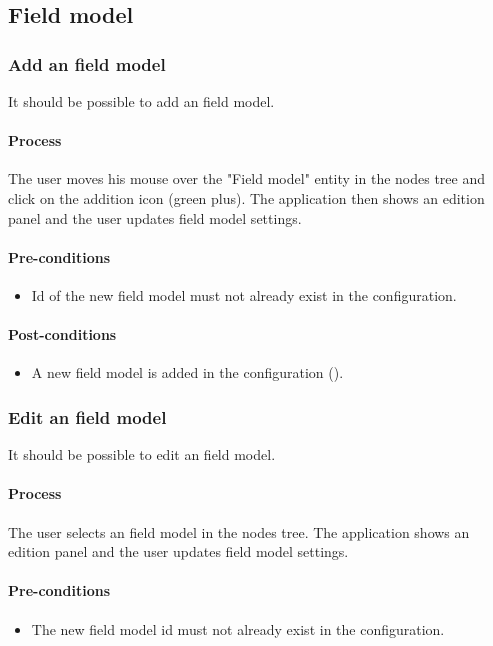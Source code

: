 \documentclass[11pt,a4paper,oneside]{article}
\begin{document}
\subsection{Field model}

\subsubsection{Add an field model}
It should be possible to add an field model.

\paragraph{Process}
The user moves his mouse over the "Field model" entity in the nodes tree and click on the addition icon (green plus). The application then shows an edition panel and the user updates field model settings.

\paragraph{Pre-conditions}
\begin{itemize}
	\item Id of the new field model must not already exist in the configuration.
\end{itemize}

\paragraph{Post-conditions}
\begin{itemize}
	\item A new field model is added in the configuration ().
\end{itemize}

\subsubsection{Edit an field model}
It should be possible to edit an field model.

\paragraph{Process}
The user selects an field model in the nodes tree. The application shows an edition panel and the user updates field model settings.

\paragraph{Pre-conditions}
\begin{itemize}
	\item The new field model id must not already exist in the configuration.
\end{itemize}
\end{document}
